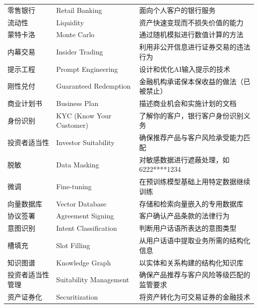 \begin{longtable}{lp{2.5cm}p{7cm}}
零售银行 & Retail Banking & 面向个人客户的银行服务 \\
流动性 & Liquidity & 资产快速变现而不损失价值的能力 \\
蒙特卡洛 & Monte Carlo & 通过随机模拟进行数值计算的方法 \\
内幕交易 & Insider Trading & 利用非公开信息进行证券交易的违法行为 \\
提示工程 & Prompt Engineering & 设计和优化AI输入提示的技术 \\
刚性兑付 & Guaranteed Redemption & 金融机构承诺保本保收益的做法（已被禁止） \\
商业计划书 & Business Plan & 描述商业机会和实施计划的文档 \\
身份识别 & KYC (Know Your Customer) & 了解你的客户，银行客户身份识别义务 \\
投资者适当性 & Investor Suitability & 确保推荐产品与客户风险承受能力匹配 \\
脱敏 & Data Masking & 对敏感数据进行遮蔽处理，如6222****1234 \\
微调 & Fine-tuning & 在预训练模型基础上用特定数据继续训练 \\
向量数据库 & Vector Database & 存储和检索向量嵌入的专用数据库 \\
协议签署 & Agreement Signing & 客户确认产品条款的法律行为 \\
意图识别 & Intent Classification & 判断用户话语所表达的意图类型 \\
槽填充 & Slot Filling & 从用户话语中提取业务所需的结构化信息 \\
知识图谱 & Knowledge Graph & 以实体和关系构建的结构化知识库 \\
投资者适当性管理 & Suitability Management & 确保产品推荐与客户风险等级匹配的监管要求 \\
资产证券化 & Securitization & 将资产转化为可交易证券的金融技术 \\
\bottomrule
\end{longtable}
